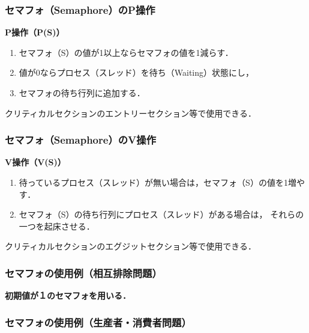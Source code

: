 \documentclass[unicode]{beamer}                   %
\begin{document}
\begin{frame}
  \frametitle{セマフォ（Semaphore）のP操作}
  {\bf P操作（P(S)）}
  \begin{enumerate}
  \item セマフォ（S）の値が1以上ならセマフォの値を1減らす．
  \item 値が0ならプロセス（スレッド）を待ち（Waiting）状態にし，
  \item セマフォの待ち行列に追加する．
  \end{enumerate}
  クリティカルセクションのエントリーセクション等で使用できる．

  \begin{center}
    \begin{minipage}{0.6\columnwidth}
    \end{minipage}
  \end{center}
\end{frame}

\begin{frame}
  \frametitle{セマフォ（Semaphore）のV操作}
  {\bf V操作（V(S)）}
  \begin{enumerate}
  \item 待っているプロセス（スレッド）が無い場合は，セマフォ（S）の値を1増やす．
  \item セマフォ（S）の待ち行列にプロセス（スレッド）がある場合は，
    それらの一つを起床させる．
  \end{enumerate}
  クリティカルセクションのエグジットセクション等で使用できる．

  \begin{center}
    \begin{minipage}{0.6\columnwidth}
    \end{minipage}
  \end{center}
\end{frame}

\begin{frame}
  \frametitle{セマフォの使用例（相互排除問題）}
  {\bf 初期値が１のセマフォを用いる．}
\end{frame}

\begin{frame}
  \frametitle{セマフォの使用例（生産者・消費者問題）}
\end{frame}
\end{document}
